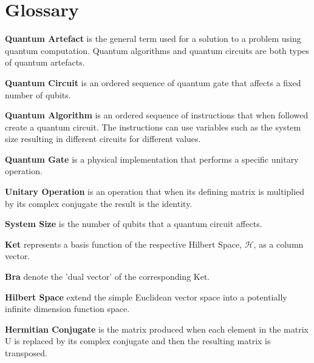 \chapter{Glossary}
\noindent\textbf{Quantum Artefact} is the general term used for a solution to a problem using quantum computation.
Quantum algorithms and quantum circuits are both types of quantum artefacts.

\noindent\textbf{Quantum Circuit} is an ordered sequence of quantum gate that affects a fixed number of qubits.

\noindent\textbf{Quantum Algorithm} is an ordered sequence of instructions that when followed create a quantum circuit.
The instructions can use variables such as the system size resulting in different circuits for different values.

\noindent\textbf{Quantum Gate} is a physical implementation that performs a specific unitary operation.

\noindent\textbf{Unitary Operation} is an operation that when its defining matrix is multiplied by its complex conjugate the result is the identity.

\noindent\textbf{System Size} is the number of qubits that a quantum circuit affects.

\noindent\textbf{Ket} represents a basis function of the respective Hilbert Space, $\mathcal{H}$, as a column vector.

\noindent\textbf{Bra} denote the 'dual vector' of the corresponding Ket.

\noindent\textbf{Hilbert Space} extend the simple Euclidean vector space into a potentially infinite dimension function space.

\noindent\textbf{Hermitian Conjugate} is the matrix produced when each element in the matrix U is replaced by its complex conjugate and then the resulting matrix is transposed.